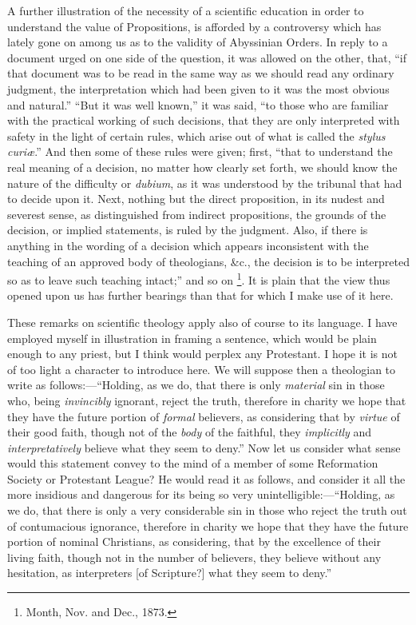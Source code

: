 A further illustration of the necessity of a scientific education in
order to understand the value of Propositions, is afforded by a
controversy which has lately gone on among us as to the validity of
Abyssinian Orders. In reply to a document urged on one side of the
question, it was allowed on the other, that, ``if that document was
to be read in the same way as we should read any ordinary judgment, the
interpretation which had been given to it was the most obvious and
natural.'' ``But it was well known,'' it was said, ``to
those who are familiar with the practical working of such decisions,
that they are only interpreted with safety in the light of certain
rules, which arise out of what is called the \emph{stylus curiæ}.''
And then some of these rules were given; first, ``that to understand
the real meaning of a decision, no matter how clearly set forth, we
should know the nature of the difficulty or \emph{dubium}, as it was
understood by the tribunal that had to decide upon it. Next,
nothing but the direct proposition, in its nudest and severest sense, as
distinguished from indirect propositions, the grounds of the decision,
or implied statements, is ruled by the judgment. Also, if there is
anything in the wording of a decision which appears inconsistent with
the teaching of an approved body of theologians, \&c., the decision
is to be interpreted so as to leave such teaching intact;'' and so
on \footnote{Month, Nov. and Dec., 1873.}. It is plain that the
view thus opened upon us has further bearings than that for which I make
use of it here.

These remarks on scientific theology apply also of course to its
language. I have employed myself in illustration in framing a sentence,
which would be plain enough to any priest, but I think would perplex any
Protestant. I hope it is not of too light a character to introduce here.
We will suppose then a theologian to write as follows:—``Holding,
as we do, that there is only \emph{material} sin in those who, being \emph{invincibly}
ignorant, reject the truth, therefore in charity we hope that they have
the future portion of \emph{formal} believers, as considering that by \emph{virtue}
of their good faith, though not of the \emph{body} of the faithful, they
\emph{implicitly} and \emph{interpretatively} believe what they seem to
deny.'' Now let us consider what sense would this statement convey
to the mind of a member of some Reformation Society or Protestant
League? He would read it as follows, and consider it all the more
insidious and dangerous for its being so very unintelligible:—``Holding,
as we do, that there is only a very considerable sin in those who
reject the truth out of contumacious ignorance, therefore in charity we
hope that they have the future portion of nominal Christians, as
considering, that by the excellence of their living faith, though not in
the number of believers, they believe without any hesitation, as
interpreters [of Scripture?] what they seem to deny.''

